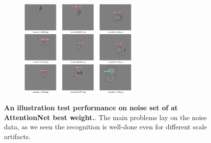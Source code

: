 \begin{figure}[h]
	\begin{center}
		\begin{subfigure}[t]{\textwidth}
		    \centering
			\includegraphics[width=0.65\textwidth]{thesis-template-master/images/An illustration test performance of CellYolo best weight2.png}
			\label{fig:cellnet}
		\end{subfigure}
	\end{center}
	\caption{\textbf{An illustration test performance on noise set of at AttentionNet best weight.}. The main problems lay on the noise data, as we seen the recognition is well-done even for different scale artifacts.}
\end{figure}



